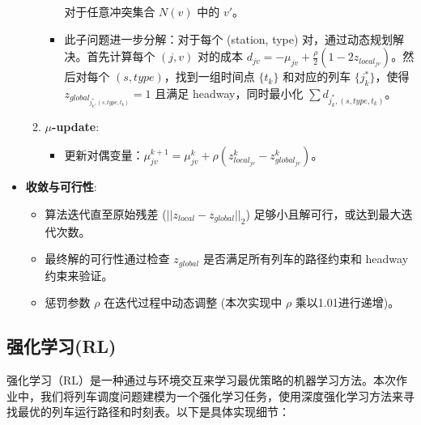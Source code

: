 \documentclass{article}
\begin{document}
\begin{itemize}
\begin{enumerate}
\begin{itemize}
                对于任意冲突集合 $N(v)$ 中的 $v'$。
                \item 此子问题进一步分解：对于每个 (station, type)
                对，通过动态规划解决。首先计算每个 $(j,v)$ 对的成本 $d_{jv} =
                -\mu_{jv} + \frac{\rho}{2} (1 - 2
                z_{local_{jv}})$。然后对每个 $(s, type)$，找到一组时间点
                $\{t_k\}$ 和对应的列车 $\{j_k^*\}$，使得
                $z_{global_{j_k^*, (s,type,t_k)}}=1$ 且满足
                headway，同时最小化 $\sum d_{j_k^*, (s,type,t_k)}$。
            \end{itemize}
            \item \textbf{$\mu$-update}:
            \begin{itemize}
                \item 更新对偶变量：$\mu_{jv}^{k+1} = \mu_{jv}^k + \rho
                (z_{local_{jv}}^k - z_{global_{jv}}^k)$。
            \end{itemize}
        \end{enumerate}
        \item \textbf{收敛与可行性}:
        \begin{itemize}
            \item 算法迭代直至原始残差 ($||z_{local} - z_{global}||_2$) 足够小且解可行，或达到最大迭代次数。
            \item 最终解的可行性通过检查 $z_{global}$ 是否满足所有列车的路径约束和 headway 约束来验证。
            \item 惩罚参数 $\rho$ 在迭代过程中动态调整 (本次实现中 $\rho$ 乘以1.01进行递增)。
        \end{itemize}
    \end{itemize}

    \subsection{强化学习(RL)}

    强化学习（RL）是一种通过与环境交互来学习最优策略的机器学习方法。本次作业中，我们将列车调度问题建模为一个强化学习任务，使用深度强化学习方法来寻找最优的列车运行路径和时刻表。以下是具体实现细节：
\end{document}
